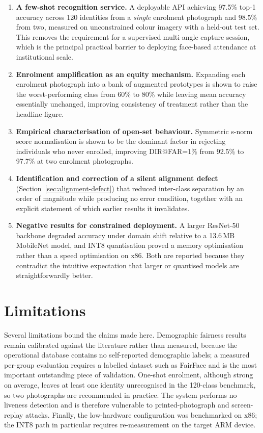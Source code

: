 \documentclass[12pt,a4paper]{report}
\begin{document}
\begin{enumerate}
  \item \textbf{A few-shot recognition service.} A deployable API achieving 97.5\%
        top-1 accuracy across 120 identities from a \emph{single} enrolment
        photograph and 98.5\% from two, measured on unconstrained colour imagery
        with a held-out test set. This removes the requirement for a supervised
        multi-angle capture session, which is the principal practical barrier to
        deploying face-based attendance at institutional scale.
  \item \textbf{Enrolment amplification as an equity mechanism.} Expanding each
        enrolment photograph into a bank of augmented prototypes is shown to raise
        the worst-performing class from 60\% to 80\% while leaving mean accuracy
        essentially unchanged, improving consistency of treatment rather than the
        headline figure.
  \item \textbf{Empirical characterisation of open-set behaviour.} Symmetric
        s-norm score normalisation is shown to be the dominant factor in rejecting
        individuals who never enrolled, improving DIR@FAR=1\% from 92.5\% to
        97.7\% at two enrolment photographs.
  \item \textbf{Identification and correction of a silent alignment defect}
        (Section~\ref{sec:alignment-defect}) that reduced inter-class separation
        by an order of magnitude while producing no error condition, together with
        an explicit statement of which earlier results it invalidates.
  \item \textbf{Negative results for constrained deployment.} A larger ResNet-50
        backbone degraded accuracy under domain shift relative to a 13.6\,MB
        MobileNet model, and INT8 quantisation proved a memory optimisation rather
        than a speed optimisation on x86. Both are reported because they
        contradict the intuitive expectation that larger or quantised models are
        straightforwardly better.
\end{enumerate}

\section{Limitations}
Several limitations bound the claims made here. Demographic fairness results
remain calibrated against the literature rather than measured, because the
operational database contains no self-reported demographic labels; a measured
per-group evaluation requires a labelled dataset such as FairFace and is the most
important outstanding piece of validation. One-shot enrolment, although strong on
average, leaves at least one identity unrecognised in the 120-class benchmark, so
two photographs are recommended in practice. The system performs no liveness
detection and is therefore vulnerable to printed-photograph and screen-replay
attacks. Finally, the low-hardware configuration was benchmarked on x86; the
INT8 path in particular requires re-measurement on the target ARM device.
\end{document}
